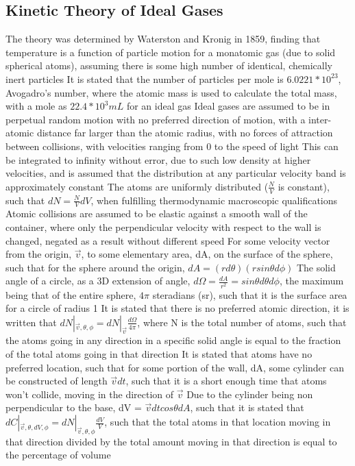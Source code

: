 \documentclass[11 pt, twoside]{article}
\newenvironment{outline*}
{
	\begin{outline}[enumerate]
	}
	{\end{outline}
}
\begin{document}
\subsection{Kinetic Theory of Ideal Gases}
\begin{outline*}
\1 The theory was determined by Waterston and Kronig in 1859, finding that temperature is a function of particle motion for a monatomic gas (due to solid spherical atoms), assuming there is some high number of identical, chemically inert particles
\2 It is stated that the number of particles per mole is $6.0221 * 10^23$, Avogadro's number, where the atomic mass is used to calculate the total mass, with a mole as $22.4 * 10^3 mL$ for an ideal gas
\2 Ideal gases are assumed to be in perpetual random motion with no preferred direction of motion, with a inter-atomic distance far larger than the atomic radius, with no forces of attraction between collisions, with velocities ranging from 0 to the speed of light
\3 This can be integrated to infinity without error, due to such low density at higher velocities, and is assumed that the distribution at any particular velocity band is approximately constant
\2 The atoms are uniformly distributed ($\frac{N}{V}$ is constant), such that $dN = \frac{N}{V}dV$, when fulfilling thermodynamic macroscopic qualifications
\2 Atomic collisions are assumed to be elastic against a smooth wall of the container, where only the perpendicular velocity with respect to the wall is changed, negated as a result without different speed
\1 For some velocity vector from the origin, $\vec{v}$, to some elementary area, dA, on the surface of the sphere, such that for the sphere around the origin, $dA = (rd\theta)(rsin\theta d\phi)$
\2 The solid angle of a circle, as a 3D extension of angle, $d\Omega = \frac{dA}{r^2} = sin \theta d\theta d\phi$, the maximum being that of the entire sphere, $4\pi$ steradians (sr), such that it is the surface area for a circle of radius 1
\1 It is stated that there is no preferred atomic direction, it is written that $dN|_{\vec{v}, \theta, \phi} = dN|_\vec{v} \frac{d\Omega}{4\pi}$, where N is the total number of atoms, such that the atoms going in any direction in a specific solid angle is equal to the fraction of the total atoms going in that direction
\1 It is stated that atoms have no preferred location, such that for some portion of the wall, dA, some cylinder can be constructed of length $\vec{v}dt$, such that it is a short enough time that atoms won't collide, moving in the direction of $\vec{v}$
\2 Due to the cylinder being non perpendicular to the base, dV = $\vec{v}dt cos\theta dA$, such that it is stated that $dC|_{\vec{v}, \theta, dV, \phi} = dN|_{\vec{v}, \theta, \phi}\frac{dV}{V}$, such that the total atoms in that location moving in that direction divided by the total amount moving in that direction is equal to the percentage of volume

\end{outline*}
\end{document}
